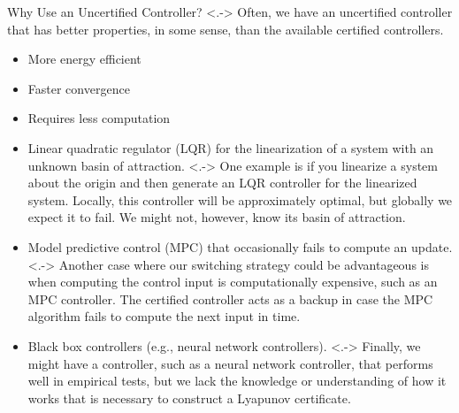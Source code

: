 \documentclass[notheorems, aspectratio=169, presentation]{beamer}
\newcommand{\itemnote}[1]{\note[item]<.->{#1}}
\begin{document}
\begin{frame}[t]{Why Use an Uncertified Controller?}
  \pause
  \itemnote{
    Often, we have an uncertified controller that 
    has better properties, in some sense, 
    than the available certified controllers.
  }
  \begin{itemize}[<+->]
    \setlength{\itemsep}{5pt}
    \item More energy efficient
    \item Faster convergence
    \item Requires less computation
  \end{itemize}
  \begin{itemize}[<+->]
    \item Linear quadratic regulator (LQR) for 
    the linearization of a system with an unknown basin of attraction.
    \itemnote{
      One example is if you linearize a system about the origin 
      and then generate an LQR controller
      for the linearized system. Locally, this controller will be 
      approximately optimal, but globally we expect it to fail. 
      We might not, however, know its basin of attraction.
    }
    \item Model predictive control (MPC) that 
    occasionally fails to compute an update.
    \itemnote{
      Another case where our switching strategy 
      could be advantageous is when 
      computing the control input is computationally expensive, 
      such as an MPC controller. 
      The certified controller acts as a backup
      in case the MPC algorithm fails to compute 
      the next input in time.
    }
    \item Black box controllers (e.g., neural network controllers).
    \itemnote{
      Finally, we might have a controller, 
      such as a neural network controller,
      that performs well in empirical tests, but 
      we lack the knowledge or understanding of 
      how it works that is necessary 
      to construct a Lyapunov certificate.
    }
  \end{itemize}

\end{frame}


\end{document}
